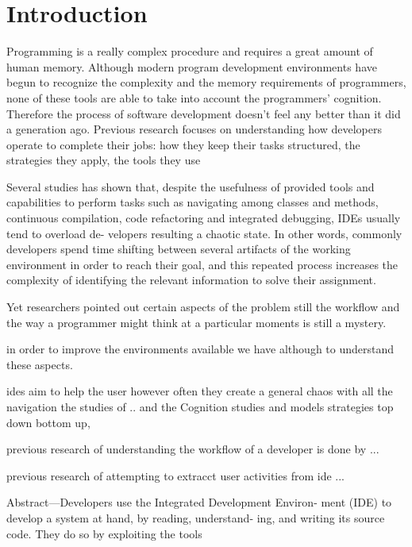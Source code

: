 \chapter{Introduction}

Programming is a really complex procedure and requires a great amount of human memory. Although modern program development environments have begun to recognize the complexity and the memory requirements of programmers, none of these tools are able to take into account the programmers' cognition.  Therefore the process of software development doesn't feel any better than it did a generation ago. Previous research focuses on understanding how developers operate to complete their jobs: how they keep their tasks structured, the strategies they apply, the tools they use


Several studies has shown that, despite the usefulness of provided tools and capabilities to perform tasks such as navigating among classes and methods, continuous compilation, code refactoring and integrated debugging, IDEs usually tend to overload de- velopers resulting a chaotic state. In other words, commonly developers spend time shifting between several artifacts of the working environment in order to reach their goal, and this repeated process increases the complexity of identifying the relevant information to solve their assignment. 

Yet researchers pointed out certain aspects of the problem still the workflow and the way a programmer might think at a particular moments is still a mystery.

in order to improve the environments available we have although to understand these aspects.

ides aim to help the user however often they create a general chaos with all the navigation the studies of .. and the Cognition studies and models strategies top down bottom up, 

previous research of understanding the workflow of a developer is done by ... 

previous research of attempting to extracct user activities from \gls{ide} ... 

Abstract—Developers use the Integrated Development Environ-
ment (IDE) to develop a system at hand, by reading, understand-
ing, and writing its source code. They do so by exploiting the tools

